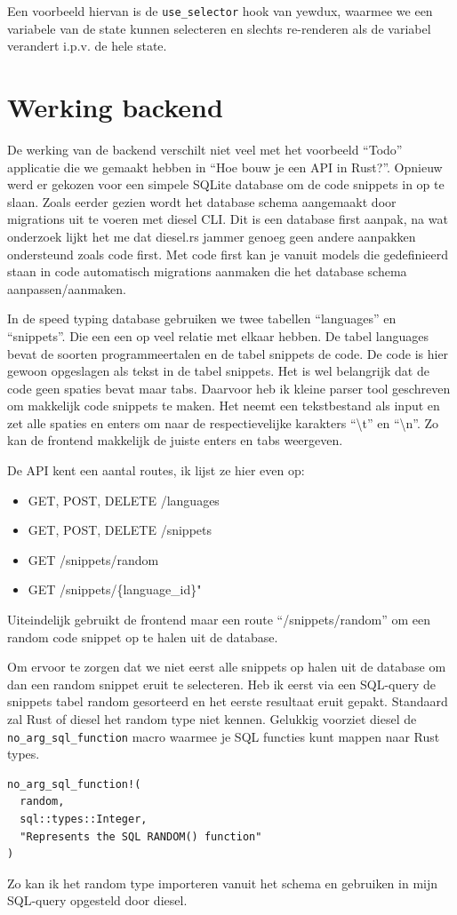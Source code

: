 Een voorbeeld hiervan is de \texttt{use_selector} hook van yewdux, waarmee we een
variabele van de state kunnen selecteren en slechts re-renderen als de variabel verandert i.p.v. de
hele state.

\clearpage

\section{Werking backend}

De werking van de backend verschilt niet veel met het voorbeeld “Todo” applicatie die we gemaakt
hebben in “Hoe bouw je een API in Rust?”. Opnieuw werd er gekozen voor een simpele SQLite database
om de code snippets in op te slaan. Zoals eerder gezien wordt het database schema aangemaakt door
migrations uit te voeren met diesel CLI.  Dit is een database first aanpak, na wat onderzoek lijkt
het me dat diesel.rs jammer genoeg geen andere aanpakken ondersteund zoals code first. Met code
first kan je vanuit models die gedefinieerd staan in code automatisch migrations aanmaken die het
database schema aanpassen/aanmaken. 

In de speed typing database gebruiken we twee tabellen “languages” en “snippets”. Die een een op
veel relatie met elkaar hebben. De tabel languages bevat de soorten programmeertalen en de tabel
snippets de code. De code is hier gewoon opgeslagen als tekst in de tabel snippets. Het is wel
belangrijk dat de code geen spaties bevat maar tabs. Daarvoor heb ik kleine parser tool geschreven
om makkelijk code snippets te maken. Het neemt een tekstbestand als input en zet alle spaties en
enters om naar de respectievelijke karakters “\textbackslash t” en “\textbackslash n”. Zo kan de
frontend makkelijk de juiste enters en tabs weergeven. 

De API kent een aantal routes, ik lijst ze hier even op: 
\begin{itemize}
    \item GET, POST, DELETE  /languages
    \item GET, POST, DELETE /snippets 
    \item GET /snippets/random 
    \item GET /snippets/\{language\_id\}"
\end{itemize}

Uiteindelijk gebruikt de frontend maar een route “/snippets/random” om een random code snippet op te
halen uit de database. 

Om ervoor te zorgen dat we niet eerst alle snippets op halen uit de database om dan een random
snippet eruit te selecteren. Heb ik eerst via een SQL-query de snippets tabel random gesorteerd en
het eerste resultaat eruit gepakt. Standaard zal Rust of diesel het random type niet kennen.
Gelukkig voorziet diesel de \texttt{no_arg_sql_function} macro waarmee je SQL functies
kunt mappen naar Rust types.

\begin{listing}[h]
\begin{verbatim}
no_arg_sql_function!(
  random,
  sql::types::Integer,
  "Represents the SQL RANDOM() function"
)
\end{verbatim}
\end{listing}

Zo kan ik het random type importeren vanuit het schema en gebruiken in mijn SQL-query opgesteld door diesel.
